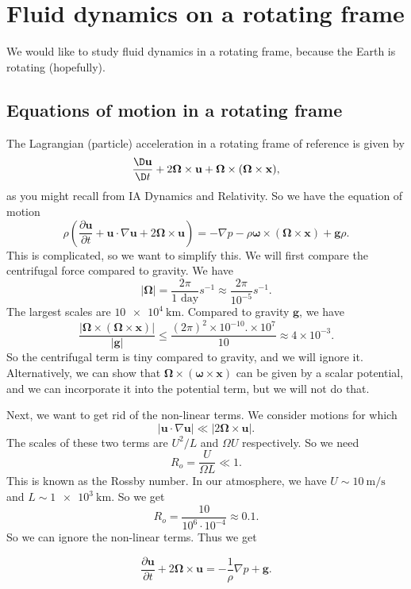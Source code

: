 \documentclass[a4paper]{article}
\begin{document}
\section{Fluid dynamics on a rotating frame}
We would like to study fluid dynamics in a rotating frame, because the Earth is rotating (hopefully).

\subsection{Equations of motion in a rotating frame}

The Lagrangian (particle) acceleration in a rotating frame of reference is given by
\[
  \frac{\D \mathbf{u}}{\D t} + 2 \boldsymbol\Omega \times \mathbf{u} + \boldsymbol\Omega \times (\boldsymbol\Omega \times \mathbf{x}),
\]
as you might recall from IA Dynamics and Relativity. So we have the equation of motion
\[
  \rho\left(\frac{\partial \mathbf{u}}{\partial t} + \mathbf{u}\cdot \nabla \mathbf{u} + 2 \boldsymbol\Omega \times \mathbf{u}\right) = -\nabla p - \rho \boldsymbol\omega \times (\boldsymbol\Omega \times \mathbf{x}) + \mathbf{g} \rho.
\]
This is complicated, so we want to simplify this. We will first compare the centrifugal force compared to gravity. We have
\[
  |\boldsymbol\Omega| = \frac{2\pi}{1\text{ day}} s^{-1} \approx \frac{2\pi}{10^{-5}}s^{-1}.
\]
The largest scales are $\SI{10e4}{\kilo\meter}$. Compared to gravity $\mathbf{g}$, we have
\[
  \frac{|\boldsymbol\Omega \times (\boldsymbol\Omega \times \mathbf{x})|}{|\mathbf{g}|}\leq \frac{(2\pi)^2 \times 10^{-10}.\times 10^7}{10} \approx 4 \times 10^{-3}.
\]
So the centrifugal term is tiny compared to gravity, and we will ignore it. Alternatively, we can show that $\boldsymbol\Omega \times (\boldsymbol\omega \times \mathbf{x})$ can be given by a scalar potential, and we can incorporate it into the potential term, but we will not do that.

Next, we want to get rid of the non-linear terms. We consider motions for which
\[
  |\mathbf{u}\cdot \nabla \mathbf{u}| \ll |2 \boldsymbol\Omega \times \mathbf{u}|.
\]
The scales of these two terms are $U^2/L$ and $\Omega U$ respectively. So we need
\[
  R_o = \frac{U}{\Omega L} \ll 1.
\]
This is known as the Rossby number. In our atmosphere, we have $U \sim \SI{10}{\meter\per\second}$ and $L \sim \SI{1e3}{\kilo\meter}$. So we get
\[
  R_o = \frac{10}{10^6 \cdot 10^{-4}} \approx 0.1.
\]
So we can ignore the non-linear terms. Thus we get
\begin{prop}
  \[
    \frac{\partial \mathbf{u}}{\partial t} + 2 \boldsymbol\Omega \times \mathbf{u} = -\frac{1}{\rho} \nabla p + \mathbf{g}.
  \]
\end{prop}
\end{document}
